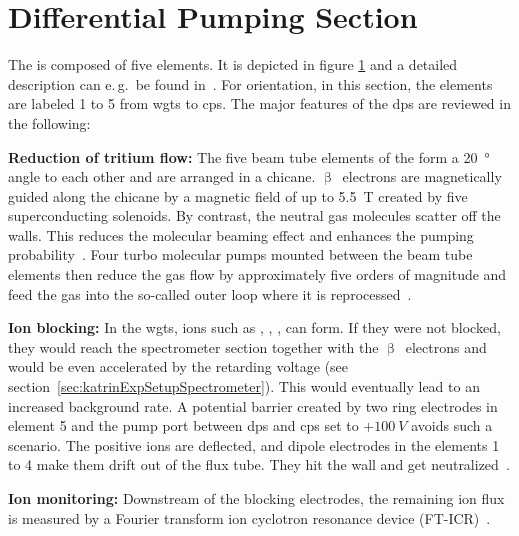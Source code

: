 \section{Differential Pumping Section}
\label{sec:katrinExpSetupDiffPumpingSection}
\begin{figure}[t]
 \label{fig:katrinExpSetupDiffPumpingSection}
\end{figure}
The  is composed of five elements. It is depicted in figure \ref{fig:katrinExpSetupDiffPumpingSection} and a detailed description can e.\,g.~be found in~\cite{Kosmider2012}. For orientation, in this section, the elements are labeled 1 to 5 from \gls{wgts} to \gls{cps}. The major features of the \gls{dps} are reviewed in the following:

{\par\textbf{Reduction of tritium flow:}
The five beam tube elements of the  form a \SI{20}{\degree} angle to each other and are arranged in a chicane. $\upbeta$~electrons are magnetically guided along the chicane by a magnetic field of up to \SI{5.5}{T} created by five superconducting solenoids. By contrast, the neutral gas molecules scatter off the walls. This reduces the molecular beaming effect and enhances the pumping probability~\cite{ZHANG2012}. Four turbo molecular pumps mounted between the beam tube elements then reduce the gas flow by approximately five orders of magnitude and feed the gas into the so-called outer loop where it is reprocessed~\cite{Kosmider2012}.}

{\par\textbf{Ion blocking:}
In the \gls{wgts}, ions such as , , ,  can form. If they were not blocked, they would reach the spectrometer section together with the $\upbeta$~electrons and would be even accelerated by the retarding voltage (see section~\ref{sec:katrinExpSetupSpectrometer}). This would eventually lead to an increased background rate. A potential barrier created by two ring electrodes in element 5 and the pump port between \gls{dps} and \gls{cps} set to $+\SI{100}{V}$ avoids such a scenario. The positive ions are deflected, and dipole electrodes in the elements 1 to 4 make them drift out of the flux tube. They hit the wall and get neutralized~\cite{Klein2019}.}

{\par\textbf{Ion monitoring:}
Downstream of the blocking electrodes, the remaining ion flux is measured by a Fourier transform ion cyclotron resonance device (FT-ICR)~\cite{Ubieto2009}.}

